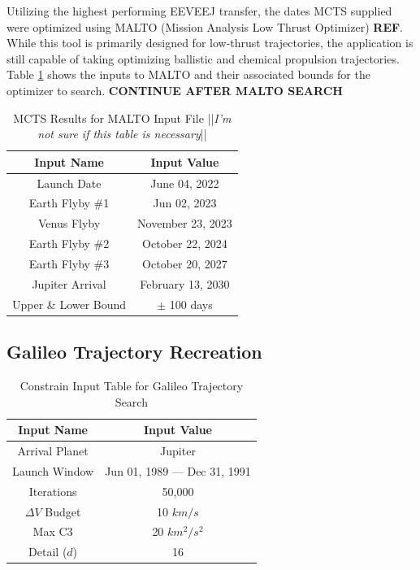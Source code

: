 \documentclass[letterpaper, preprint, paper,11pt]{AAS}	%
\begin{document}
Utilizing the highest performing EEVEEJ transfer, the dates MCTS supplied were optimized using MALTO (Mission Analysis Low Thrust Optimizer) \textbf{REF}. While this tool is primarily designed for low-thrust trajectories, the application is still capable of taking optimizing ballistic and chemical propulsion trajectories. Table \ref*{table:clipMInputs} shows the inputs to MALTO and their associated bounds for the optimizer to search. \textbf{CONTINUE AFTER MALTO SEARCH}

\begin{table}[htb]
    \begin{center}
        \caption{MCTS Results for MALTO Input File ||\textit{I'm not sure if this table is necessary}||}
        \label{table:clipMInputs}
        \begin{tabular}{c|c}
            \textbf{Input Name} & \textbf{Input Value}\\
            \hline
            Launch Date & June 04, 2022 \\
            Earth Flyby \#1 & Jun 02, 2023 \\
            Venus Flyby & November 23, 2023 \\ 
            Earth Flyby \#2 & October 22, 2024 \\
            Earth Flyby \#3 & October 20, 2027 \\
            Jupiter Arrival & February 13, 2030 \\
            Upper \& Lower Bound & $\pm$ 100 days
        \end{tabular}
    \end{center}
\end{table}

\vspace*{3in}
\subsection{Galileo Trajectory Recreation}

\begin{table}[htb]
    \begin{center}
        \caption{Constrain Input Table for Galileo Trajectory Search}
        \label{table:clipInputs}
        \begin{tabular}{c|c}
            \textbf{Input Name} & \textbf{Input Value}\\
            \hline
            Arrival Planet & Jupiter \\
            Launch Window & Jun 01, 1989 --- Dec 31, 1991 \\
            Iterations & 50,000 \\ 
            $\Delta V$ Budget & 10 $km/s$ \\
            Max C3 & 20 $km^2/s^2$ \\
            Detail ($d$) & 16 
        \end{tabular}
    \end{center}
    \end{table}
\end{document}
